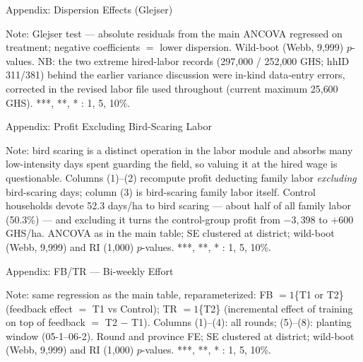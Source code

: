 \documentclass[aspectratio=169]{beamer}
\newcommand{\notefont}{\fontsize{5pt}{6pt}\selectfont}
\begin{document}
\begin{frame}{Appendix: Dispersion Effects (Glejser)}
	\centering
	\begin{minipage}{0.94\textwidth}
		\notefont
		Note: Glejser test --- absolute residuals from the main ANCOVA regressed on
		treatment; negative coefficients $=$ lower dispersion. Wild-boot (Webb, 9{,}999)
		$p$-values. NB: the two extreme hired-labor records (297{,}000 / 252{,}000 GHS;
		hhID 311/381) behind the earlier variance discussion were in-kind data-entry errors,
		corrected in the revised labor file used throughout (current maximum 25{,}600 GHS).
		***, **, * : 1, 5, 10\%.
	\end{minipage}
\end{frame}

\begin{frame}{Appendix: Profit Excluding Bird-Scaring Labor}
	\centering
	\begin{minipage}{0.94\textwidth}
		\notefont
		Note: bird scaring is a distinct operation in the labor module and absorbs many
		low-intensity days spent guarding the field, so valuing it at the hired wage is
		questionable. Columns (1)--(2) recompute profit deducting family labor
		\emph{excluding} bird-scaring days; column (3) is bird-scaring family labor itself.
		Control households devote 52.3 days/ha to bird scaring --- about half of all family
		labor (50.3\%) --- and excluding it turns the control-group profit from $-3{,}398$ to
		$+600$ GHS/ha. ANCOVA as in the main table; SE clustered at district; wild-boot
		(Webb, 9{,}999) and RI (1{,}000) $p$-values. ***, **, * : 1, 5, 10\%.
	\end{minipage}
\end{frame}



\begin{frame}{Appendix: FB/TR --- Bi-weekly Effort}
	\centering
	\begin{minipage}{0.94\textwidth}
		\notefont
		Note: same regression as the main table, reparameterized: FB $=1$\{T1 or T2\}
		(feedback effect $=$ T1 vs Control); TR $=1$\{T2\} (incremental effect of training on top
		of feedback $=$ T2 $-$ T1). Columns (1)--(4): all rounds; (5)--(8): planting window
		(05-1--06-2). Round and province FE; SE clustered at district; wild-boot (Webb, 9{,}999)
		and RI (1{,}000) $p$-values. ***, **, * : 1, 5, 10\%.
	\end{minipage}
\end{frame}
\end{document}
